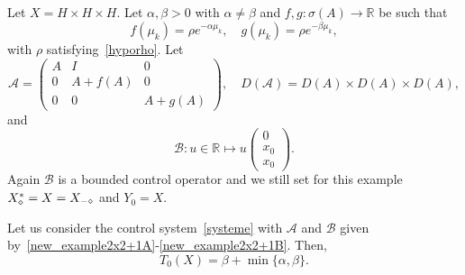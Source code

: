 \documentclass[AHL,Unicode,longabstracts]{cedram}
\newcommand\A{\mathcal{A}}
\newcommand\B{\mathcal{B}}
\newcommand{\DA}{D(\A)}
\newcommand{\Xalphas}{X_\diamond^*}
\newcommand{\Xmalpha}{X_{-\diamond}}
\newcommand{\Fzp}{Y_0}
\newcommand{\R}{\mathbb{R}}
\begin{document}
Let $X=H\times H\times H$. Let $\alpha,\beta>0$ with $\alpha\neq\beta$ and $f, g : \sigma(A) \to \R$ be such that
\[
f(\mu_k) = \rho e^{-\alpha \mu_k},
\quad g(\mu_k) = \rho e^{-\beta \mu_k},
\]
with $\rho$ satisfying~\eqref{hyporho}. Let
\begin{equation}\label{new_example2x2+1A}
\A=
\begin{pmatrix} A & I & 0 \\ 0 & A+f(A) & 0 \\ 0 & 0 &A+g(A)
\end{pmatrix},
\quad
\DA=D(A)\times D(A)\times D(A),
\end{equation}
and
\begin{equation}\label{new_example2x2+1B}
\B : u \in \R \mapsto u
\begin{pmatrix} 0 \\ x_0 \\ x_0
\end{pmatrix}.
\end{equation}
Again $\B$ is a bounded control operator and we still set for this example $\Xalphas = X\linebreak=\Xmalpha$ and $\Fzp=X$.

\begin{prop}\label{Prop:Academique3}
Let us consider the control system~\eqref{systeme} with $\A$ and $\B$ given by~\eqref{new_example2x2+1A}-\eqref{new_example2x2+1B}. Then,
\[
T_0(X) = \beta + \min\{ \alpha, \beta \}.
\]
\end{prop}
\end{document}
